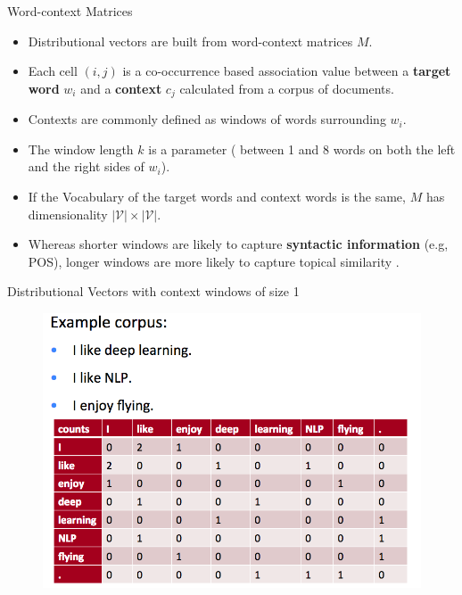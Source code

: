 \documentclass[handout]{beamer}
\begin{document}
\begin{frame}{Word-context Matrices}
\begin{scriptsize}
\begin{itemize}
\item Distributional vectors are built from word-context matrices $M$. 
\item Each cell $(i,j)$ is a co-occurrence based association value between a \textbf{target word} $w_i$ and a \textbf{context} $c_j$ calculated  from a corpus of documents.
\item Contexts are commonly defined as windows of words surrounding $w_i$.
\item The window length $k$ is a parameter ( between 1 and 8 words on both the left and the right sides of $w_i$).
\item If the Vocabulary of the target words and context words is the same, $M$ has dimensionality $|\mathcal{V}| \times |\mathcal{V}|$.
\item Whereas shorter windows are likely to capture \textbf{syntactic information} (e.g, POS), longer windows are more likely to capture topical similarity \cite{goldberg2016primer, JurafskyBook}.
\end{itemize}

\end{scriptsize}
\end{frame}



\begin{frame}{Distributional Vectors with context windows of size 1}


\begin{figure}[htb]
	\centering
	 \includegraphics[scale=0.3]{pics/distributionalSocher.png}
\end{figure}



\end{frame}
\end{document}
